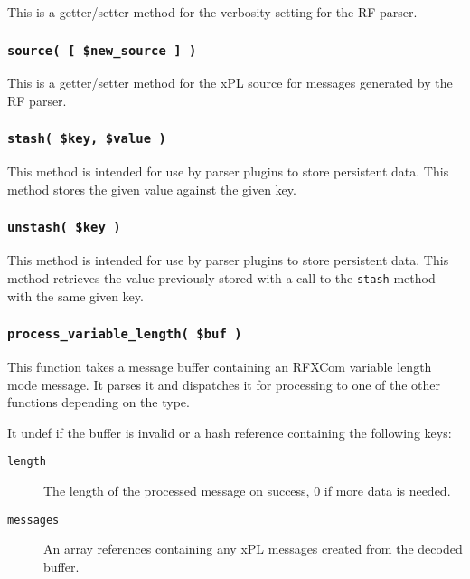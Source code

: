 \documentclass[12pt,a4paper]{article}
\begin{document}
This is a getter/setter method for the verbosity setting for the RF parser.

\subsubsection*{\texttt{source( [ \$new\_source ] )}\label{xPL::RF_source_new_source_}}


This is a getter/setter method for the xPL source for messages generated
by the RF parser.

\subsubsection*{\texttt{stash( \$key, \$value )}\label{xPL::RF_stash_key_value_}}


This method is intended for use by parser plugins to store
persistent data.  This method stores the given value against
the given key.

\subsubsection*{\texttt{unstash( \$key )}\label{xPL::RF_unstash_key_}}


This method is intended for use by parser plugins to store persistent
data.  This method retrieves the value previously stored with a call
to the \texttt{stash} method with the same given key.

\subsubsection*{\texttt{process\_variable\_length( \$buf )}\label{xPL::RF_process_variable_length_buf_}}


This function takes a message buffer containing an RFXCom variable
length mode message.  It parses it and dispatches it for processing to
one of the other functions depending on the type.



It undef if the buffer is invalid or a hash reference containing the
following keys:

\begin{description}

\item[{\texttt{length}}] \mbox{}

The length of the processed message on success, 0 if more
data is needed.


\item[{\texttt{messages}}] \mbox{}

An array references containing any xPL messages created from the
decoded buffer.

\end{description}
\end{document}
